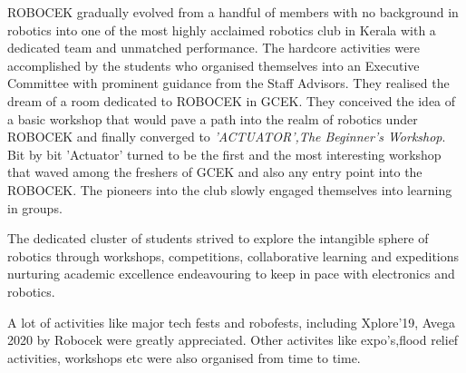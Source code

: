 \par ROBOCEK gradually evolved from a handful of members with no background in robotics into one of the most highly acclaimed robotics club in Kerala with a dedicated team and unmatched performance. The hardcore activities were accomplished by the students who organised themselves into an Executive Committee with prominent guidance from the Staff Advisors. They realised the dream of a room dedicated to ROBOCEK in GCEK. They conceived the idea of a basic workshop that would pave a path into the realm of robotics under ROBOCEK and finally converged to \textit{'ACTUATOR',The Beginner's Workshop}. Bit by bit 'Actuator' turned to be the first and the most interesting workshop that waved among the freshers of GCEK and also any entry point into the ROBOCEK. The pioneers into the club slowly engaged themselves into learning in groups.

The dedicated cluster of students strived to explore the intangible sphere of robotics through workshops, competitions, collaborative learning and expeditions nurturing academic excellence endeavouring to keep in pace with electronics and robotics. 

A lot of activities like major tech fests and robofests, including Xplore'19, Avega 2020 by Robocek were greatly appreciated. Other activites like expo's,flood relief activities, workshops etc were also organised from time to time. 